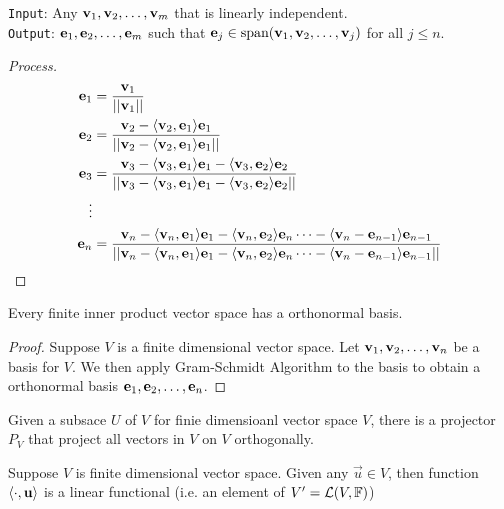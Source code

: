 \begin{algorithm}
    \texttt{Input}: Any ${\mathbf v}_1,{\mathbf v}_2, \ldots, {\mathbf v}_{m}$ that is linearly independent. \\
    \texttt{Output}: ${\mathbf e}_1,{\mathbf e}_2, \ldots, {\mathbf e}_{m}$ such that $\mathbf e_j \in \text{span} ({\mathbf v}_1,{\mathbf v}_2, \ldots, {\mathbf v}_{j})$ for all $j \leq n$.
    \begin{proof}[Process] $ $
        \begin{align*}\mathbf e_1 &= \frac{\mathbf v_1}{||\mathbf v_1||} \\
        \mathbf e_2 &= \frac{\mathbf v_2 - \langle \mathbf v_2, \mathbf e_1 \rangle \mathbf e_1}{||\mathbf v_2 - \langle \mathbf v_2, \mathbf e_1 \rangle \mathbf e_1||} \\
        \mathbf e_3 &= \frac{\mathbf v_3 - \langle \mathbf v_3, \mathbf e_1 \rangle \mathbf e_1 - \langle \mathbf v_3, \mathbf e_2 \rangle \mathbf e_2}{||\mathbf v_3 - \langle \mathbf v_3, \mathbf e_1 \rangle \mathbf e_1 - \langle \mathbf v_3, \mathbf e_2 \rangle \mathbf e_2||} \\
        \vdots \\
        \mathbf e_n &= \frac{\mathbf v_n - \langle \mathbf v_{n}, \mathbf e_1 \rangle \mathbf e_1 - \langle \mathbf v_n, \mathbf e_2 \rangle \mathbf e_n \cdots - \langle \mathbf v_n - \mathbf e_{n-1} \rangle \mathbf e_{n-1}}{||\mathbf v_n - \langle \mathbf v_{n}, \mathbf e_1 \rangle \mathbf e_1 - \langle \mathbf v_n, \mathbf e_2 \rangle \mathbf e_n \cdots - \langle \mathbf v_n - \mathbf e_{n-1} \rangle \mathbf e_{n-1}||}
        \end{align*}
    \end{proof}
\end{algorithm}
\begin{proposition}
    Every finite inner product vector space has a orthonormal basis. 
\end{proposition}
\begin{proof}
    Suppose $V$ is a finite dimensional vector space. Let ${\mathbf v}_1,{\mathbf v}_2, \ldots, {\mathbf v}_{n}$ be a basis for $V$. We then apply Gram-Schmidt Algorithm to the basis to obtain a orthonormal basis ${\mathbf e}_1,{\mathbf e}_2, \ldots, {\mathbf e}_{n}$. 
\end{proof}
\begin{remark}
    Given a subsace $U$ of $V$ for finie dimensioanl vector space $V$, there is a projector $P_V$ that project all vectors in $V$ on $V$ orthogonally.
\end{remark}
\begin{remark}
    Suppose $V$ is finite dimensional vector space. Given any $\vec u \in V$, then function $\langle \cdot, \mathbf u\rangle$ is a linear functional (i.e. an element of $V' = \mathcal L(V,\mathbb F)$)
\end{remark}
